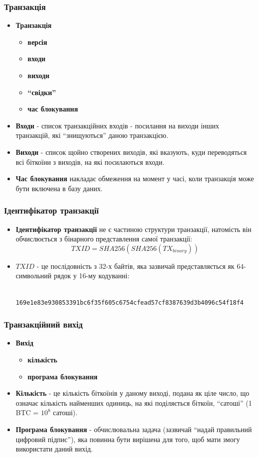 \documentclass{beamer}
\begin{document}
\begin{frame}
  \frametitle{Транзакція}
  \begin{itemize}
  \item \textbf{Транзакція}
    \begin{itemize}
    \item \textbf{версія}
    \item \textbf{входи}
    \item \textbf{виходи}
    \item \textbf{``свідки''}
    \item \textbf{час блокування}
    \end{itemize}
  \item \textbf{Входи} - список транзакційних входів - посилання на виходи інших
    транзакцій, які ``знищуються'' даною транзакцією.
  \item \textbf{Виходи} - список щойно створених виходів, які вказують, куди
    переводяться всі біткоїни з виходів, на які посилаються входи.
  \item \textbf{Час блокування} накладає обмеження на момент у часі, коли
    транзакція може бути включена в базу даних.
  \end{itemize}
\end{frame}

\begin{frame}[fragile]
  \frametitle{Ідентифікатор транзакції}
  \begin{itemize}
  \item \textbf{Ідентифікатор транзакції} не є частиною структури транзакції,
    натомість він обчислюється з бінарного представлення самої транзакції:
    $$TXID = SHA256(SHA256(TX_{binary}))$$
  \item $TXID$ - це послідовність з 32-х байтів, яка зазвичай представляється як
    64-символьний рядок у 16-му кодуванні:
    \begin{verbatim}
      169e1e83e930853391bc6f35f605c6754cfead57cf8387639d3b4096c54f18f4
    \end{verbatim}
  \end{itemize}
\end{frame}

\begin{frame}
  \frametitle{Транзакційний вихід}
  \begin{itemize}
  \item \textbf{Вихід}
    \begin{itemize}
    \item \textbf{кількість}
    \item \textbf{програма блокування}
    \end{itemize}
  \item \textbf{Кількість} - це кількість біткоїнів у даному виході, подана як
    ціле число, що означає кількість найменших одиниць, на які поділяється
    біткоїн, ``сатоші'' (1 BTC = $10^8$ сатоші).
  \item \textbf{Програма блокування} - обчислювальна задача (зазвичай ``надай
    правильний цифровий підпис''), яка повинна бути вирішена для того, щоб мати
    змогу використати даний вихід.
  \end{itemize}
\end{frame}
\end{document}
